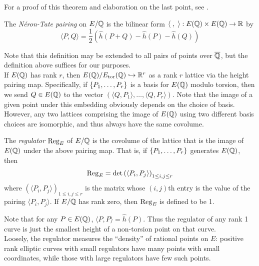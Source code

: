For a proof of this theorem and elaboration on the last point, see \cite[pp. 227-232]{Sil-1985}.

\begin{definition}
The {\it N\'eron-Tate pairing} on $E/\mathbb{Q}$ is the bilinear form $\langle\;,\;\rangle: E(\mathbb{Q})\times E(\mathbb{Q}) \to \mathbb{R}$ by
	\begin{equation}
		\langle P,Q \rangle = \frac{1}{2}\left(\hat{h}(P+Q) - \hat{h}(P) - \hat{h}(Q)\right)
	\end{equation}
\end{definition}
Note that this definition may be extended to all pairs of points over $\overline{\mathbb{Q}}$, but the definition above suffices for our purposes. \\

If $E(\mathbb{Q})$ has rank $r$, then $E(\mathbb{Q})/E_{\text{tor}}(\mathbb{Q}) \hookrightarrow \mathbb{R}^r$ as a rank $r$ lattice via the height pairing map. Specifically, if $\left\{P_1,\ldots, P_r\right\}$ is a basis for $E(\mathbb{Q})$ modulo torsion, then we send $Q \in E(\mathbb{Q})$ to the vector $\left( \langle Q,P_1 \rangle, \ldots, \langle Q,P_r \rangle \right)$. Note that the image of a given point under this embedding obviously depends on the choice of basis. However, any two lattices comprising the image of $E(\mathbb{Q})$ using two different basis choices are isomorphic, and thus always have the same covolume.

\begin{definition}
The {\it regulator} $\operatorname{Reg}_E$ of $E/\mathbb{Q}$ is the covolume of the lattice that is the image of $E(\mathbb{Q})$ under the above pairing map. That is, if $\left\{P_1,\ldots,P_r\right\}$ generates $E(\mathbb{Q})$, then
\begin{equation}
	\operatorname{Reg}_E = \det\left(\langle P_i,P_j\rangle \right)_{1 \le i,j \le r}
\end{equation}
where $\left(\langle P_i,P_j\rangle \right)_{1 \le i,j \le r}$ is the matrix whose $(i,j)$th entry is the value of the pairing $\langle P_i,P_j\rangle$. If $E/\mathbb{Q}$ has rank zero, then $\operatorname{Reg}_E$ is defined to be 1.
\end{definition}
Note that for any $P \in E(\mathbb{Q})$, $\langle P, P \rangle = \hat{h}(P)$. Thus the regulator of any rank 1 curve is just the smallest height of a non-torsion point on that curve. \\

Loosely, the regulator measures the ``density'' of rational points on $E$: positive rank elliptic curves with small regulators have many points with small coordinates, while those with large regulators have few such points.\\

